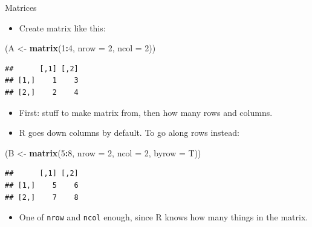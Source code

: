 \documentclass[ignorenonframetext,]{beamer}
\newenvironment{Shaded}{\begin{snugshade}}{\end{snugshade}}
\newcommand{\DataTypeTok}[1]{\textcolor[rgb]{0.13,0.29,0.53}{#1}}
\newcommand{\DecValTok}[1]{\textcolor[rgb]{0.00,0.00,0.81}{#1}}
\newcommand{\KeywordTok}[1]{\textcolor[rgb]{0.13,0.29,0.53}{\textbf{#1}}}
\newcommand{\NormalTok}[1]{#1}
\newcommand{\OperatorTok}[1]{\textcolor[rgb]{0.81,0.36,0.00}{\textbf{#1}}}
\newcommand{\StringTok}[1]{\textcolor[rgb]{0.31,0.60,0.02}{#1}}
\providecommand{\tightlist}{%
  \setlength{\itemsep}{0pt}\setlength{\parskip}{0pt}}
\begin{document}
\begin{frame}[fragile]{Matrices}
\protect\hypertarget{matrices}{}

\begin{itemize}
\tightlist
\item
  Create matrix like this:
\end{itemize}

\begin{Shaded}
\begin{Highlighting}[]
\NormalTok{(A <-}\StringTok{ }\KeywordTok{matrix}\NormalTok{(}\DecValTok{1}\OperatorTok{:}\DecValTok{4}\NormalTok{, }\DataTypeTok{nrow =} \DecValTok{2}\NormalTok{, }\DataTypeTok{ncol =} \DecValTok{2}\NormalTok{))}
\end{Highlighting}
\end{Shaded}

\begin{verbatim}
##      [,1] [,2]
## [1,]    1    3
## [2,]    2    4
\end{verbatim}

\begin{itemize}
\tightlist
\item
  First: stuff to make matrix from, then how many rows and columns.
\item
  R goes down columns by default. To go along rows instead:
\end{itemize}

\begin{Shaded}
\begin{Highlighting}[]
\NormalTok{(B <-}\StringTok{ }\KeywordTok{matrix}\NormalTok{(}\DecValTok{5}\OperatorTok{:}\DecValTok{8}\NormalTok{, }\DataTypeTok{nrow =} \DecValTok{2}\NormalTok{, }\DataTypeTok{ncol =} \DecValTok{2}\NormalTok{, }\DataTypeTok{byrow =}\NormalTok{ T))}
\end{Highlighting}
\end{Shaded}

\begin{verbatim}
##      [,1] [,2]
## [1,]    5    6
## [2,]    7    8
\end{verbatim}

\begin{itemize}
\tightlist
\item
  One of \texttt{nrow} and \texttt{ncol} enough, since R knows how many
  things in the matrix.
\end{itemize}

\end{frame}
\end{document}
